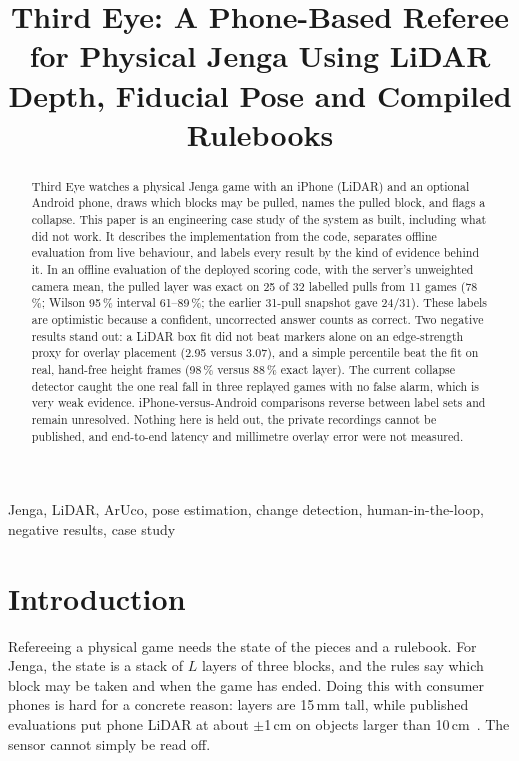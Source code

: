 \documentclass[conference,10pt]{IEEEtran}
\begin{document}
\title{Third Eye: A Phone-Based Referee for Physical Jenga Using LiDAR Depth, Fiducial Pose and Compiled Rulebooks}
\author{
}
\maketitle

\begin{abstract}
Third Eye watches a physical Jenga game with an iPhone (LiDAR) and an optional Android phone, draws which blocks may be pulled, names the pulled block, and flags a collapse. This paper is an engineering case study of the system as built, including what did not work. It describes the implementation from the code, separates offline evaluation from live behaviour, and labels every result by the kind of evidence behind it. In an offline evaluation of the deployed scoring code, with the server's unweighted camera mean, the pulled layer was exact on 25 of 32 labelled pulls from 11 games (78\,\%; Wilson 95\,\% interval 61--89\,\%; the earlier 31-pull snapshot gave 24/31). These labels are optimistic because a confident, uncorrected answer counts as correct. Two negative results stand out: a LiDAR box fit did not beat markers alone on an edge-strength proxy for overlay placement (2.95 versus 3.07), and a simple percentile beat the fit on real, hand-free height frames (98\,\% versus 88\,\% exact layer). The current collapse detector caught the one real fall in three replayed games with no false alarm, which is very weak evidence. iPhone-versus-Android comparisons reverse between label sets and remain unresolved. Nothing here is held out, the private recordings cannot be published, and end-to-end latency and millimetre overlay error were not measured.
\end{abstract}
\begin{IEEEkeywords}
Jenga, LiDAR, ArUco, pose estimation, change detection, human-in-the-loop, negative results, case study
\end{IEEEkeywords}

\section{Introduction}
Refereeing a physical game needs the state of the pieces and a rulebook. For Jenga, the state is a stack of $L$ layers of three blocks, and the rules say which block may be taken and when the game has ended. Doing this with consumer phones is hard for a concrete reason: layers are 15\,mm tall, while published evaluations put phone LiDAR at about $\pm$1\,cm on objects larger than 10\,cm~\cite{luetzenburg2021}. The sensor cannot simply be read off.
\end{document}
